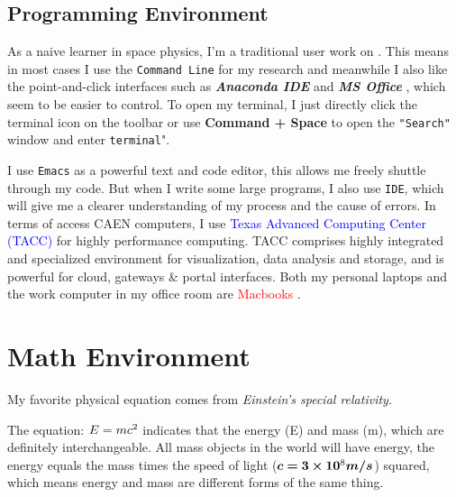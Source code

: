 \documentclass[12pt, letterpaper]{article} %
\begin{document}
\subsection{Programming Environment} %
As a naive learner in space physics, I'm a traditional  user work on . 
This means in most cases I use the \texttt{Command Line} for my research and meanwhile I also 
like the point-and-click interfaces such as \textit{\textbf{Anaconda IDE}}   and \textit{\textbf{MS Office}} , 
which seem to be easier to control. To open my terminal, I just directly click the terminal icon on the 
toolbar or use \textbf{Command + Space} to open the \texttt{"Search"} window and enter \texttt{terminal}". %

\noindent %
I use \texttt{Emacs} as a powerful text and code editor, this allows me freely shuttle through my code. But when I write some large programs, I also use \texttt{IDE}, which will give me a clearer understanding of my process and the cause of errors. In terms of access CAEN computers, I use \textcolor{blue}{Texas Advanced Computing Center (TACC)} for highly performance computing. TACC comprises highly integrated and specialized environment for visualization, data analysis and storage, and is powerful for cloud, gateways \& portal interfaces. Both my personal laptops and the work computer in my office room are \textcolor{red}{Macbooks} . 





\section{Math Environment} %
My favorite physical equation comes from  \textit{Einstein's special relativity}. 

The equation: $E = mc\textsuperscript{2}$ indicates that the energy (E) and mass (m), 
which are definitely interchangeable. All mass objects in the world will have energy, 
the energy equals the mass times the speed of light ($\bm{c = 3\times10\textsuperscript{8} m/s}$) 
squared, which means energy and mass are different forms of the same thing. \\ %
\end{document}
